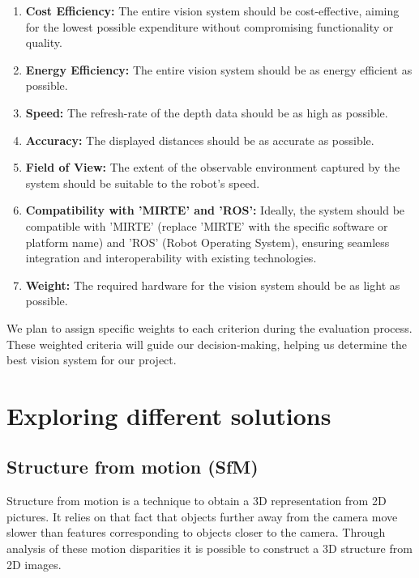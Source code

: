 \documentclass{article}[a4paper]
\begin{document}
\begin{enumerate}
    \item \textbf{Cost Efficiency:} The entire vision system should be cost-effective, aiming for the lowest    	           possible expenditure without compromising functionality or quality.

    \item \textbf{Energy Efficiency:} The entire vision system should be as energy efficient as possible.

    \item \textbf{Speed:} The refresh-rate of the depth data should be as high as possible.

    \item \textbf{Accuracy:} The displayed distances should be as accurate as possible.

    \item \textbf{Field of View:}  The extent of the observable environment captured by the system should be suitable to the robot's speed. 

    \item \textbf{Compatibility with 'MIRTE' and 'ROS':} Ideally, the system should be compatible with 'MIRTE' (replace 'MIRTE' with the specific software or platform name) and 'ROS' (Robot Operating System), ensuring seamless integration and interoperability with existing technologies.

    \item \textbf{Weight:} The required hardware for the vision system should be as light as possible.

\end{enumerate}

We plan to assign specific weights to each criterion during the evaluation process. These weighted criteria will guide our decision-making, helping us determine the best vision system for our project.

\newpage
\section{Exploring different solutions}

\subsection{Structure from motion (SfM)}
Structure from motion is a technique to obtain a 3D representation from 2D pictures. It relies on that fact that objects further away from the camera move slower than features corresponding to objects closer to the camera. Through analysis of these motion disparities it is possible to construct a 3D structure from 2D images.
\end{document}
